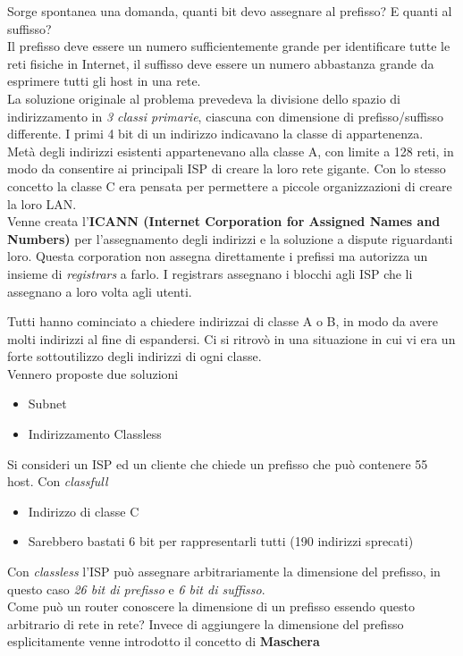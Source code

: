\documentclass{article}
\newcounter{subsubsubsection}[subsubsection]
\begin{document}
                    Sorge spontanea una domanda, quanti bit devo assegnare al prefisso? E quanti al suffisso?\\
                    Il prefisso deve essere un numero sufficientemente grande per identificare tutte le reti fisiche in Internet, il suffisso deve essere un numero abbastanza grande da esprimere tutti gli host in una rete.\\
                    La soluzione originale al problema prevedeva la divisione dello spazio di indirizzamento in \textit{3 classi primarie}, ciascuna con dimensione di prefisso/suffisso differente. I primi 4 bit di un indirizzo indicavano la classe di appartenenza.\\
                    Metà degli indirizzi esistenti appartenevano alla classe A, con limite a 128 reti, in modo da consentire ai principali ISP di creare la loro rete gigante. Con lo stesso concetto la classe C era pensata per permettere a piccole organizzazioni di creare la loro LAN.\\
                    Venne creata l'\textbf{ICANN (Internet Corporation for Assigned Names and Numbers)} per l'assegnamento degli indirizzi e la soluzione a dispute riguardanti loro. Questa corporation non assegna direttamente i prefissi ma autorizza un insieme di \textit{registrars} a farlo. I registrars assegnano i blocchi agli ISP che li assegnano a loro volta agli utenti.
                    
                    Tutti hanno cominciato a chiedere indirizzai di classe A o B, in modo da avere molti indirizzi al fine di espandersi. Ci si ritrovò in una situazione in cui vi era un forte sottoutilizzo degli indirizzi di ogni classe.\\
                    Vennero proposte due soluzioni
                    \begin{itemize}
                        \item Subnet
                        \item Indirizzamento Classless
                    \end{itemize}
                    Si consideri un ISP ed un cliente che chiede un prefisso che può contenere 55 host. Con \textit{classfull}
                    \begin{itemize}
                        \item Indirizzo di classe C
                        \item Sarebbero bastati 6 bit per rappresentarli tutti (190 indirizzi sprecati)
                    \end{itemize}
                    Con \textit{classless} l'ISP può assegnare arbitrariamente la dimensione del prefisso, in questo caso \textit{26 bit di prefisso} e \textit{6 bit di suffisso}.\\
                    Come può un router conoscere la dimensione di un prefisso essendo questo arbitrario di rete in rete? Invece di aggiungere la dimensione del prefisso esplicitamente venne introdotto il concetto di \textbf{Maschera}
\end{document}
